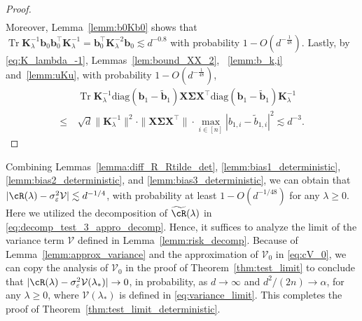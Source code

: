 \documentclass[twoside,11pt]{article}
\newcommand{\diag}{\text{diag}}
\def\bK{{\boldsymbol K}}
\def\bX{{\boldsymbol X}}
\def\bb{{\boldsymbol b}}
\def\bSigma{{\boldsymbol \Sigma}}
\def\cV{{\mathcal V}}
\def\cV{{\mathcal V}}
\renewcommand{\bK}{\boldsymbol{K}}
\newcommand{\Tr}{\operatorname{Tr}}
\newcommand{\1}{\mathbf{1}}
\newenvironment{proofoftheorem}[1]{\par\noindent{\bf Proof of Theorem #1\ }}{\hfill\BlackBox\\[2mm]}
\begin{document}
\begin{proof}
\begin{align}
\end{align}
Moreover, Lemma~\ref{lemm:b0Kb0} shows that $\Tr\bK_{\lambda}^{-1}\bb_0\bb_0^\top\bK_{\lambda}^{-1} = \bb_0^\top\bK_{\lambda}^{-2}\bb_0\lesssim d^{-0.8}$ with probability $1-O(d^{-\frac{1}{48}})$. Lastly, by \eqref{eq:K_lambda_-1}, Lemmas~\ref{lem:bound_XX_2}, ~\ref{lemm:b_k,i} and~\ref{lemm:uKu},  with probability $1-O(d^{-\frac{1}{48}})$,
\begin{align} 
 &\Tr\bK_{\lambda}^{-1}\diag(\bb_1-\widetilde\bb_1)\bX\bSigma\bX^\top\diag(\bb_1-\widetilde\bb_1)\bK_{\lambda}^{-1}\\
 \le ~& \sqrt{d} \|\bK_{\lambda}^{-1}\|^2\cdot \|\bX\bSigma\bX^\top\|\cdot \max_{i\in[n]}|b_{1,i}-\widetilde b_{1,i}|^2\lesssim d^{-3}.
\end{align}
\end{proof}

\begin{proofoftheorem}{\ref{thm:test_limit_deterministic}}
Combining Lemmas~\ref{lemma:diff_R_Rtilde_det}, \ref{lemm:bias1_deterministic}, \ref{lemm:bias2_deterministic}, and \ref{lemm:bias3_deterministic},  we can obtain that
$|\cR(\lambda)-\sigma_\varepsilon^2\cV|\lesssim d^{-1/4}$,
with probability at least $1-O(d^{-1/48})$ for any $\lambda\ge 0$.
Here we utilized the decomposition of $\widetilde\cR(\lambda)$ in \eqref{eq:decomp_test_3_appro_decomp}. Hence, it suffices to analyze the limit of the variance term $\cV$ defined in Lemma~\ref{lemm:risk_decomp}. Because of Lemma~\ref{lemm:approx_variance} and the approximation of $\cV_0$ in \eqref{eq:cV_0}, we can copy the analysis of $\cV_0$ in the proof of Theorem~\ref{thm:test_limit} to conclude that 
$|\cR(\lambda)-\sigma_{\varepsilon}^2\cV(\lambda_*)|\to 0$,
in probability, as $d\to\infty$ and $d^2/(2n)\to\alpha$, for any $\lambda\ge 0$, where $\cV(\lambda_*) $ is defined in \eqref{eq:variance_limit}. This completes the proof of 
Theorem~\ref{thm:test_limit_deterministic}.  
\end{proofoftheorem}
\end{document}
